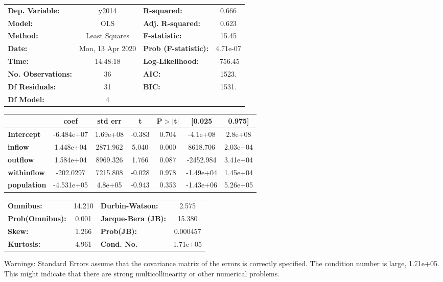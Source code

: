 \begin{center}
\begin{tabular}{lclc}
\toprule
\textbf{Dep. Variable:}    &      y2014       & \textbf{  R-squared:         } &     0.666   \\
\textbf{Model:}            &       OLS        & \textbf{  Adj. R-squared:    } &     0.623   \\
\textbf{Method:}           &  Least Squares   & \textbf{  F-statistic:       } &     15.45   \\
\textbf{Date:}             & Mon, 13 Apr 2020 & \textbf{  Prob (F-statistic):} &  4.71e-07   \\
\textbf{Time:}             &     14:48:18     & \textbf{  Log-Likelihood:    } &   -756.45   \\
\textbf{No. Observations:} &          36      & \textbf{  AIC:               } &     1523.   \\
\textbf{Df Residuals:}     &          31      & \textbf{  BIC:               } &     1531.   \\
\textbf{Df Model:}         &           4      & \textbf{                     } &             \\
\bottomrule
\end{tabular}
\begin{tabular}{lcccccc}
                    & \textbf{coef} & \textbf{std err} & \textbf{t} & \textbf{P$> |$t$|$} & \textbf{[0.025} & \textbf{0.975]}  \\
\midrule
\textbf{Intercept}  &   -6.484e+07  &     1.69e+08     &    -0.383  &         0.704        &     -4.1e+08    &      2.8e+08     \\
\textbf{inflow}     &    1.448e+04  &     2871.962     &     5.040  &         0.000        &     8618.706    &     2.03e+04     \\
\textbf{outflow}    &    1.584e+04  &     8969.326     &     1.766  &         0.087        &    -2452.984    &     3.41e+04     \\
\textbf{withinflow} &    -202.0297  &     7215.808     &    -0.028  &         0.978        &    -1.49e+04    &     1.45e+04     \\
\textbf{population} &   -4.531e+05  &      4.8e+05     &    -0.943  &         0.353        &    -1.43e+06    &     5.26e+05     \\
\bottomrule
\end{tabular}
\begin{tabular}{lclc}
\textbf{Omnibus:}       & 14.210 & \textbf{  Durbin-Watson:     } &    2.575  \\
\textbf{Prob(Omnibus):} &  0.001 & \textbf{  Jarque-Bera (JB):  } &   15.380  \\
\textbf{Skew:}          &  1.266 & \textbf{  Prob(JB):          } & 0.000457  \\
\textbf{Kurtosis:}      &  4.961 & \textbf{  Cond. No.          } & 1.71e+05  \\
\bottomrule
\end{tabular}
\end{center}

Warnings: \newline
 [1] Standard Errors assume that the covariance matrix of the errors is correctly specified. \newline
 [2] The condition number is large, 1.71e+05. This might indicate that there are \newline
 strong multicollinearity or other numerical problems.